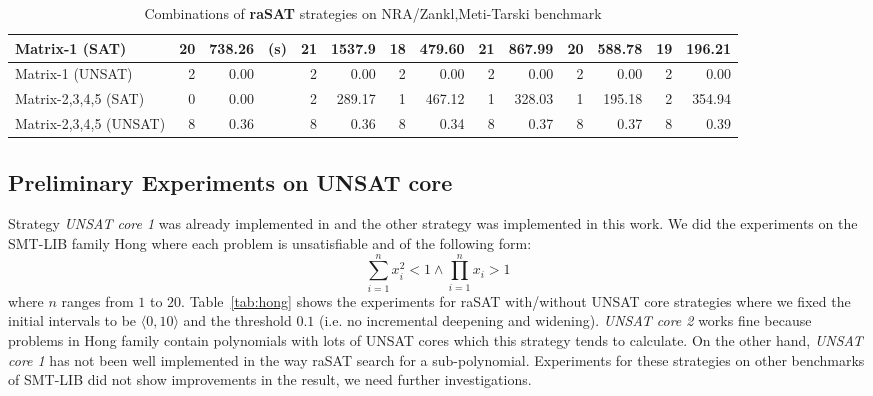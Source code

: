 \begin{table*}[t]
{\begin{tabular}{ | l | r | r  r | r | r  | r | r | r | r | r | r |r | r |}
\hline
 Matrix-1 (SAT) & 20 & 738.26 & (s) & 21 & 1537.9 & 18 & 479.60 & 21 & 867.99 & 20 & 588.78 & 19 & 196.21 
\\
\hline
 Matrix-1 (UNSAT) & 2 & 0.00 && 2 & 0.00 & 2 & 0.00 & 2 & 0.00 & 2 & 0.00 & 2 & 0.00 
\\
\hline
 Matrix-2,3,4,5 (SAT) & 0 & 0.00 && 2 & 289.17 & 1 & 467.12 & 1 & 328.03 & 1 & 195.18 & 2 & 354.94 
\\
\hline
 Matrix-2,3,4,5 (UNSAT) & 8 & 0.36 && 8 & 0.36 & 8 & 0.34 & 8 & 0.37 & 8 & 0.37 & 8 & 0.39 
\\
\hline
\end{tabular}
}
\bigskip
{}
\medskip
\caption{Combinations of {\bf raSAT} strategies on NRA/Zankl,Meti-Tarski benchmark} 
\label{tab:rasat-experiments}
\end{table*}

\subsection*{Preliminary Experiments on UNSAT core}
Strategy \emph{UNSAT core 1} was already implemented in \cite{VanKhanh201227} and the other strategy was implemented in this work. We did the experiments on the SMT-LIB family Hong where each problem is unsatisfiable and of the following form:
\[\sum_{i=1}^{n}x_i^2 < 1 \wedge \prod_{i=1}^{n}x_i > 1\]
where $n$ ranges from $1$ to $20$. Table~\ref{tab:hong} shows the experiments for raSAT with/without UNSAT core strategies where we fixed the initial intervals to be $\langle 0, 10 \rangle$ and the threshold $0.1$ (i.e. no incremental deepening and widening). \emph{UNSAT core 2} works fine because problems in Hong family contain polynomials with lots of UNSAT cores which this strategy tends to calculate. On the other hand, \emph{UNSAT core 1} has not been well implemented in the way raSAT search for a sub-polynomial. Experiments for these strategies on other benchmarks of SMT-LIB did not show improvements in the result, we need further investigations.

